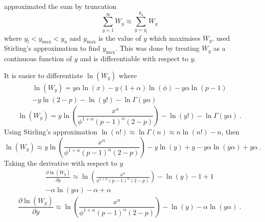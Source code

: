 \cite{dunn2005series} approximated the sum by truncation
\begin{equation}
  \sum_{y=1}^\infty W_y \approx \sum_{y=y_\text{l}}^{y_\text{u}}W_y
\end{equation}
where $y_\text{l}<y_{\text{max}}<y_\text{u}$ and $y_{\text{max}}$ is the value of $y$ which maximises $W_y$. \cite{dunn2005series} used Stirling's approximation to find $y_{\text{max}}$. This was done by treating $W_y$ as a continuous function of $y$ and is differentiable with respect to $y$.

It is easier to differentiate $\ln(W_y)$ where
\begin{multline*}
  \ln(W_y) = y\alpha\ln(x)-y(1+\alpha)\ln(\phi)-y\alpha\ln(p-1)\\-y\ln(2-p)-\ln(y!)-\ln\Gamma(y\alpha)
\end{multline*}
\begin{equation}
  \ln(W_y) =
  y
  \ln\left(
    \frac{x^\alpha}{\phi^{1+\alpha}(p-1)^\alpha(2-p)}
  \right)
  -\ln(y!)-\ln\Gamma(y\alpha)
  \ .
\end{equation}
Using Stirling's approximation $\ln(n!)\approx\ln\Gamma(n)\approx n\ln(n!)-n$, then
\begin{equation}
  \ln(W_y) \approx
  y\ln\left(
    \frac{x^\alpha}{\phi^{1+\alpha}(p-1)^\alpha(2-p)}
  \right)
  -y\ln(y)+y-y\alpha\ln(y\alpha) + y\alpha
  \ .
\end{equation}
Taking the derivative with respect to $y$
\begin{multline*}
  \frac{\partial \ln(W_y)}{\partial y} \approx
  \ln\left(
    \frac{x^\alpha}{\phi^{1+\alpha}(p-1)^\alpha(2-p)}
  \right)
  -\ln(y)-1+1
  \\
  -\alpha\ln(y\alpha)-\alpha+\alpha
\end{multline*}
\begin{equation}
  \frac{\partial \ln(W_y)}{\partial y} \approx
  \ln\left(
    \frac{x^\alpha}{\phi^{1+\alpha}(p-1)^\alpha(2-p)}
  \right)
  -\ln(y)
  -\alpha\ln(y\alpha)
  \ .
\end{equation}

